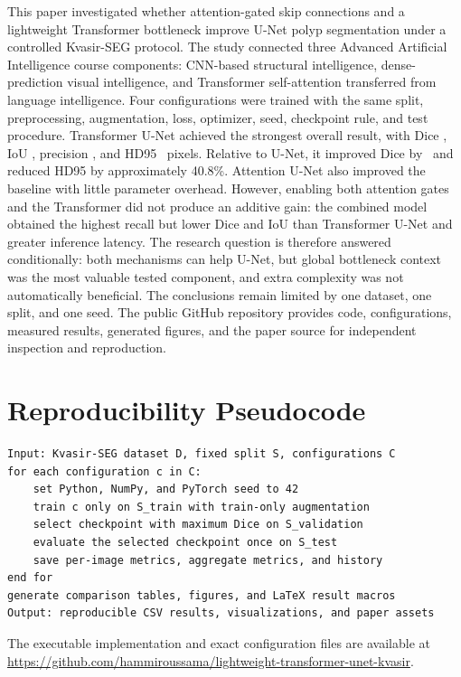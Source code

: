 \documentclass[a4paper,10pt]{article}
\begin{document}
This paper investigated whether attention-gated skip connections and a lightweight Transformer bottleneck improve U-Net polyp segmentation under a controlled Kvasir-SEG protocol. The study connected three Advanced Artificial Intelligence course components: CNN-based structural intelligence, dense-prediction visual intelligence, and Transformer self-attention transferred from language intelligence. Four configurations were trained with the same split, preprocessing, augmentation, loss, optimizer, seed, checkpoint rule, and test procedure. Transformer U-Net achieved the strongest overall result, with Dice \TransformerUNetDice, IoU \TransformerUNetIoU, precision \TransformerUNetPrecision, and HD95 \TransformerUNetHD~pixels. Relative to U-Net, it improved Dice by \DiceGain~and reduced HD95 by approximately 40.8\%. Attention U-Net also improved the baseline with little parameter overhead. However, enabling both attention gates and the Transformer did not produce an additive gain: the combined model obtained the highest recall but lower Dice and IoU than Transformer U-Net and greater inference latency. The research question is therefore answered conditionally: both mechanisms can help U-Net, but global bottleneck context was the most valuable tested component, and extra complexity was not automatically beneficial. The conclusions remain limited by one dataset, one split, and one seed. The public GitHub repository provides code, configurations, measured results, generated figures, and the paper source for independent inspection and reproduction.

\appendix
\section{Reproducibility Pseudocode}
\label{app:pseudocode}

\begin{verbatim}
Input: Kvasir-SEG dataset D, fixed split S, configurations C
for each configuration c in C:
    set Python, NumPy, and PyTorch seed to 42
    train c only on S_train with train-only augmentation
    select checkpoint with maximum Dice on S_validation
    evaluate the selected checkpoint once on S_test
    save per-image metrics, aggregate metrics, and history
end for
generate comparison tables, figures, and LaTeX result macros
Output: reproducible CSV results, visualizations, and paper assets
\end{verbatim}

The executable implementation and exact configuration files are available at
\url{https://github.com/hammiroussama/lightweight-transformer-unet-kvasir}.



\end{document}
